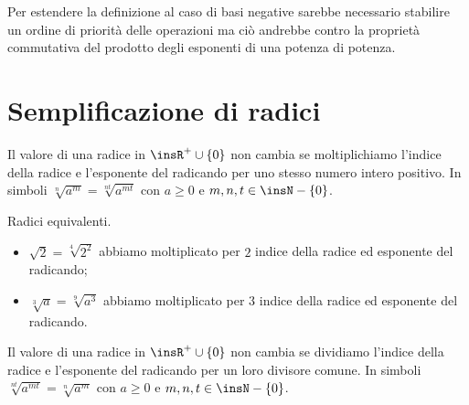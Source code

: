 Per estendere la definizione al caso di basi negative sarebbe necessario stabilire un ordine di priorità delle operazioni ma ciò andrebbe contro la proprietà commutativa del prodotto degli esponenti di una potenza di potenza.

\vspazio\ovalbox{\risolvii \ref{ese:2.16}, \ref{ese:2.17}, \ref{ese:2.18}, \ref{ese:2.19},\ref{ese:2.20}}

\section{Semplificazione di radici}

\begin{proposizione}
Il valore di una radice in $\insR^+\cup \{0\}$ non cambia se moltiplichiamo l'indice della radice e l'esponente del radicando per uno stesso numero intero positivo. In simboli $\sqrt[n]{a^m}=\sqrt[\mathit{nt}]{a^{\mathit{mt}}}$ con $a\ge 0$ e $m,n,t\in \insN-\{0\}$.
\end{proposizione}
\newpage
\begin{exrig}
 \begin{esempio}
 Radici equivalenti.
 \begin{itemize}
 \item $\sqrt 2=\sqrt[4]{2^2}$ abbiamo moltiplicato per $2$ indice della radice ed esponente del radicando;
 \item $\sqrt[3]a=\sqrt[9]{a^3}$ abbiamo moltiplicato per $3$ indice della radice ed esponente del radicando.
\end{itemize}
 \end{esempio}
\end{exrig}

\begin{proposizione}
Il valore di una radice in $\insR^+\cup \{0\}$ non cambia se dividiamo l'indice della radice e l'esponente del radicando per un loro divisore comune. In simboli $\sqrt[nt]{a^{mt}}=\sqrt[n]{a^m}$ con $a\ge 0$ e $m,n,t\in \insN-\{0\}$.
\end{proposizione}

